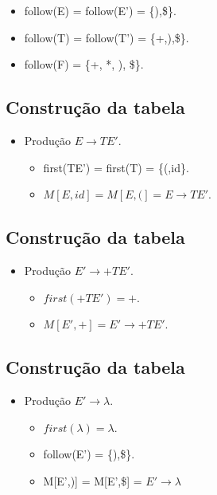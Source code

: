 \documentclass[11pt]{article}
\begin{document}
\begin{itemize}
\item follow(E) = follow(E') = \{),\$\}.

\item follow(T) = follow(T') = \{+,),\$\}.

\item follow(F) = \{+, *, ), \$\}.
\end{itemize}
\subsection*{Construção da tabela}
\label{sec:org7a7bfc4}

\begin{itemize}
\item Produção \(E \to TE'\).
\begin{itemize}
\item first(TE') = first(T) = \{(,id\}.
\item \(M[E,id] = M[E,(] = E \to TE'\).
\end{itemize}
\end{itemize}
\subsection*{Construção da tabela}
\label{sec:orgfb688e3}

\begin{itemize}
\item Produção \(E' \to +TE'\).
\begin{itemize}
\item \(first(+TE') = {+}\).
\item \(M[E',+] = E' \to +TE'\).
\end{itemize}
\end{itemize}
\subsection*{Construção da tabela}
\label{sec:orgfd8f344}

\begin{itemize}
\item Produção \(E' \to \lambda\).
\begin{itemize}
\item \(first(\lambda) = \lambda\).
\item follow(E') = \{),\$\}.
\item M[E',)] = M[E',\$] = \(E'\to\lambda\)
\end{itemize}
\end{itemize}
\end{document}
